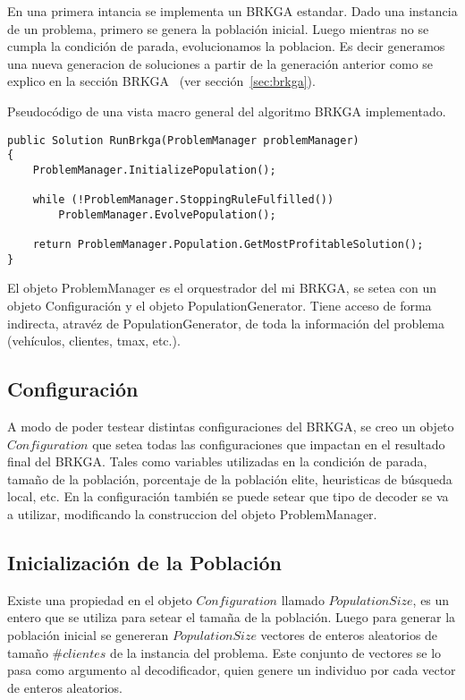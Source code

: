 En una primera intancia se implementa un BRKGA estandar. Dado una instancia de un problema, primero se genera la población inicial. Luego mientras no se cumpla la condición de parada, evolucionamos la poblacion. Es decir generamos una nueva generacion de soluciones a partir de la generación anterior como se explico en la sección BRKGA ~(ver sección~\ref{sec:brkga}).

\bigskip

Pseudocódigo de una vista macro general del algoritmo BRKGA implementado.

\bigskip

\begin{minipage}{\textwidth}
\begin{lstlisting} 
public Solution RunBrkga(ProblemManager problemManager)
{
    ProblemManager.InitializePopulation();

    while (!ProblemManager.StoppingRuleFulfilled())
        ProblemManager.EvolvePopulation();

    return ProblemManager.Population.GetMostProfitableSolution();
}
\end{lstlisting}
\end{minipage}

\bigskip

El objeto ProblemManager es el orquestrador del mi BRKGA, se setea con un objeto Configuración y el objeto PopulationGenerator. Tiene acceso de forma indirecta, atravéz de PopulationGenerator, de toda la información del problema (vehículos, clientes, tmax, etc.).

\subsection{Configuración}

A modo de poder testear distintas configuraciones del BRKGA, se creo un objeto $Configuration$ que setea todas las configuraciones que impactan en el resultado final del BRKGA. Tales como variables utilizadas en la condición de parada, tamaño de la población, porcentaje de la población elite, heuristicas de búsqueda local, etc. En la configuración también se puede setear que tipo de decoder se va a utilizar, modificando la construccion del objeto ProblemManager.

\subsection{Inicialización de la Población}

Existe una propiedad en el objeto $Configuration$ llamado $PopulationSize$, es un entero que se utiliza para setear el tamaña de la población. Luego para generar la población inicial se genereran $PopulationSize$ vectores de enteros aleatorios de tamaño $\#clientes$ de la instancia del problema. Este conjunto de vectores se lo pasa como argumento al decodificador, quien genere un individuo por cada vector de enteros aleatorios.

